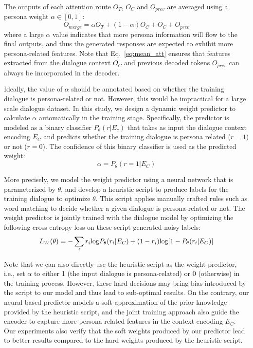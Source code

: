 \documentclass[letterpaper]{article} %
\begin{document}
The outputs of each attention route $O_T$, $O_C$ and $O_{prev}$ are averaged using a persona weight $\alpha \in [0, 1]$:
\begin{equation}\label{eq:mean_att}
    O_{merge} = \alpha O_T + (1- \alpha)O_C + O_C + O_{prev}
\end{equation}
where a large $\alpha$ value indicates that more persona information will flow to the final outputs, and thus the generated responses are expected to exhibit more persona-related features. Note that Eq.~\ref{eq:mean_att} ensures that features extracted from the dialogue context $O_C$ and previous decoded tokens $O_{prev}$ can always be incorporated in the decoder.

Ideally, the value of $\alpha$ should be annotated based on whether the training dialogue is persona-related or not. However, this would be impractical for a large scale dialogue dataset. In this study, we design a dynamic weight predictor to calculate $\alpha$ automatically in the training stage. Specifically, the predictor is modeled as a binary classifier $P_\theta(r|E_c)$ that takes as input the dialogue context encoding $E_C$ and predicts whether the training dialogue is persona related ($r=1$) or not ($r=0$). The confidence of this binary classifier is used as the predicted weight:
\begin{equation}
    \alpha = P_\theta(r=1| E_C)
\end{equation}

More precisely, we model the weight predictor using a neural network that is parameterized by $\theta$, and develop a heuristic script to produce labels for the training dialogue to optimize $\theta$. This script applies manually crafted rules such as word matching to decide whether a given dialogue is persona-related or not. The weight predictor is jointly trained with the dialogue model by optimizing the following cross entropy loss on these script-generated noisy labels:
\begin{equation*}
    L_{W}(\theta) = -\sum_i r_i{\rm log}P_\theta(r_i | E_C) + (1 - r_i){\rm log}[1 - P_\theta(r_i | E_C)]
\end{equation*}

Note that we can also directly use the heuristic script as the weight predictor, i.e., set $\alpha$ to either 1 (the input dialogue is persona-related) or 0 (otherwise) in the training process. However, these hard decisions may bring bias introduced by the script to our model and thus lead to sub-optimal results. On the contrary, our neural-based predictor models a soft approximation of the prior knowledge provided by the heuristic script, and the joint training approach also guide the encoder to capture more persona related features in the context encoding $E_C$. Our experiments also verify that the soft weights produced by our predictor lead to better results compared to the hard weights produced by the heuristic script.
\end{document}
